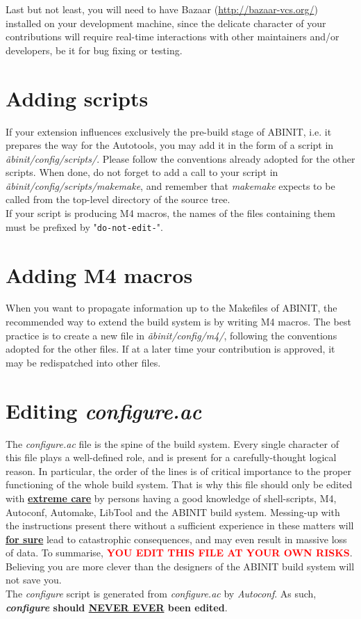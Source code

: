 Last but not least, you will need to have Bazaar
(\url{http://bazaar-vcs.org/}) installed on your development machine,
since the delicate character of your contributions will require
real-time interactions with other maintainers and/or developers, be it
for bug fixing or testing.

\section{Adding scripts}

If your extension influences exclusively the pre-build stage of ABINIT,
i.e. it prepares the way for the Autotools, you may add it in the form
of a script in \textit{\~abinit/config/scripts/}. Please follow the
conventions already adopted for the other scripts. When done, do not
forget to add a call to your script in
\textit{\~abinit/config/scripts/makemake}, and remember that
\textit{makemake} expects to be called from the top-level directory of
the source tree.
\\

If your script is producing M4 macros, the names of the files containing
them must be prefixed by "\texttt{do-not-edit-}".

\section{Adding M4 macros}

When you want to propagate information up to the Makefiles of ABINIT,
the recommended way to extend the build system is by writing M4 macros.
The best practice is to create a new file in
\textit{\~abinit/config/m4/}, following the conventions adopted for the
other files. If at a later time your contribution is approved, it may be
redispatched into other files.

\section{Editing \textit{configure.ac}}

The \textit{configure.ac} file is the spine of the build system. Every
single character of this file plays a well-defined role, and is present
for a carefully-thought logical reason. In particular, the order of the
lines is of critical importance to the proper functioning of the whole
build system. That is why this file should only be edited with
\underline{\textbf{extreme care}} by persons having a good knowledge of
shell-scripts, M4, Autoconf, Automake, LibTool and the ABINIT build
system. Messing-up with the instructions present there without a
sufficient experience in these matters will \underline{\textbf{for
sure}} lead to catastrophic consequences, and may even result in massive
loss of data. To summarise, \textcolor{red}{\textbf{YOU EDIT THIS FILE
AT YOUR OWN RISKS}}. Believing you are more clever than the
designers of the ABINIT build system will not save you.
\\

The \textit{configure} script is generated from \textit{configure.ac}
by \textit{Autoconf}. As such, \textbf{\textit{configure} should
\underline{NEVER EVER} been edited}.

